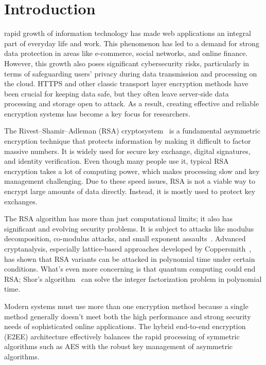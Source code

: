 \documentclass[journal]{IEEEtran}
\begin{document}
\IEEEpeerreviewmaketitle


\section{Introduction}
\label{sec:intro}
 rapid growth of information technology has made web applications an integral part of everyday life and work. This phenomenon has led to a demand for strong data protection in areas like e-commerce, social networks, and online finance. However, this growth also poses significant cybersecurity risks, particularly in terms of safeguarding users' privacy during data transmission and processing on the cloud. HTTPS and other classic transport layer encryption methods have been crucial for keeping data safe, but they often leave server-side data processing and storage open to attack. As a result, creating effective and reliable encryption systems has become a key focus for researchers.

The Rivest--Shamir--Adleman (RSA) cryptosystem~\cite{rivest1978} is a fundamental asymmetric encryption technique that protects information by making it difficult to factor massive numbers. It is widely used for secure key exchange, digital signatures, and identity verification. Even though many people use it, typical RSA encryption takes a lot of computing power, which makes processing slow and key management challenging. Due to these speed issues, RSA is not a viable way to encrypt large amounts of data directly. Instead, it is mostly used to protect key exchanges.

The RSA algorithm has more than just computational limits; it also has significant and evolving security problems. It is subject to attacks like modulus decomposition, co-modulus attacks, and small exponent assaults~\cite{boneh1999}. Advanced cryptanalysis, especially lattice-based approaches developed by Coppersmith~\cite{coppersmith1997}, has shown that RSA variants can be attacked in polynomial time under certain conditions. What's even more concerning is that quantum computing could end RSA; Shor's algorithm~\cite{shor1997} can solve the integer factorization problem in polynomial time.

Modern systems must use more than one encryption method because a single method generally doesn't meet both the high performance and strong security needs of sophisticated online applications. The hybrid end-to-end encryption (E2EE) architecture effectively balances the rapid processing of symmetric algorithms such as AES with the robust key management of asymmetric algorithms.
\end{document}
